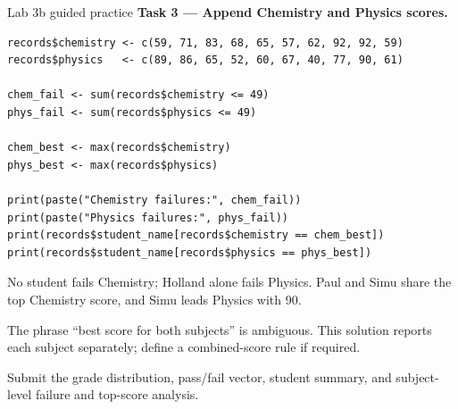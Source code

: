 \begin{labproject}{Lab 3b guided practice}
\textbf{Task 3 --- Append Chemistry and Physics scores.}

\begin{lstlisting}[style=dsr]
records$chemistry <- c(59, 71, 83, 68, 65, 57, 62, 92, 92, 59)
records$physics   <- c(89, 86, 65, 52, 60, 67, 40, 77, 90, 61)

chem_fail <- sum(records$chemistry <= 49)
phys_fail <- sum(records$physics <= 49)

chem_best <- max(records$chemistry)
phys_best <- max(records$physics)

print(paste("Chemistry failures:", chem_fail))
print(paste("Physics failures:", phys_fail))
print(records$student_name[records$chemistry == chem_best])
print(records$student_name[records$physics == phys_best])
\end{lstlisting}

No student fails Chemistry; Holland alone fails Physics. Paul and Simu share the top Chemistry score, and Simu leads Physics with 90.

\begin{referencebox}
The phrase ``best score for both subjects'' is ambiguous. This solution reports each subject separately; define a combined-score rule if required.
\end{referencebox}
\end{labproject}

\begin{labdeliverable}
Submit the grade distribution, pass/fail vector, student summary, and subject-level failure and top-score analysis.
\end{labdeliverable}
